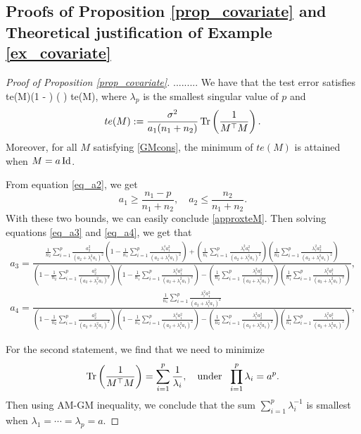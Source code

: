 \subsection{Proofs of Proposition \ref{prop_covariate} and Theoretical justification of Example \ref{ex_covariate}}\label{app_covariate}

\begin{proof}[Proof of Proposition \ref{prop_covariate}]

......... We have that the test error satisfies
\be\label{approxteM}  te(M)\left(1 -   \right)  \le  {}\tr\left( \right) \le te(M),\ee
where $\lambda_p$ is the smallest singular value of $p$ and
$$te(M):= \frac{\sigma^2}{a_1(n_1+n_2)}\operatorname{Tr}\left( \frac{1}{M^\top M}\right) .$$
Moreover, for all $M$ satisfying \eqref{GMcons}, the minimum of $te(M)$ is attained when $M= a\operatorname{Id}$.


From equation \eqref{eq_a2}, we get
$$a_1\ge \frac{n_1-p}{n_1+n_2},\quad a_2\le \frac{n_2}{n_1+n_2}.$$
With these two bounds, we can easily conclude \eqref{approxteM}. Then solving equations \eqref{eq_a3} and \eqref{eq_a4}, we get that
\begin{align*}
a_3= \frac{ \frac{1}{n_2}\sum_{i=1}^p \frac{a_2^2 }{ (  a_2 + \lambda_i^2a_1)^2  }\left(1 - \frac{1}{n_1} \sum_{i=1}^p \frac{\lambda_i^4 a_1^2  }{  (a_2 + \lambda_i^2a_1)^2  }\right) +\left( \frac{1}{n_1}\sum_{i=1}^p \frac{\lambda_i^2 a_1^2}{  (a_2 + \lambda_i^2a_1)^2  }\right) \left(\frac{1}{n_2}\sum_{i=1}^p \frac{  \lambda_i^2 a_2^2 }{ (  a_2 + \lambda_i^2a_1)^2  }\right) } {\left(1- \frac1{n_2}\sum_{i=1}^p \frac{a_2^2}{ (a_2 + \lambda_i^2a_1)^2  }\right) \left(1 - \frac{1}{n_1} \sum_{i=1}^p \frac{\lambda_i^4 a_1^2  }{  (a_2 + \lambda_i^2a_1)^2  }\right) - \left(\frac{1}{n_2}\sum_{i=1}^p \frac{  \lambda_i^2 a_2^2 }{ (  a_2 + \lambda_i^2a_1)^2  }\right) \left(\frac{1}{n_1}\sum_{i=1}^p \frac{\lambda_i^2 a_1^2 }{  (a_2 + \lambda_i^2a_1)^2  }\right)} ,
\end{align*}
\begin{align*}
a_4= \frac{\frac{1}{n_1}\sum_{i=1}^p \frac{\lambda_i^2 a_1^2}{  (a_2 + \lambda_i^2a_1)^2  }}{\left(1- \frac1{n_2}\sum_{i=1}^p \frac{a_2^2}{ (a_2 + \lambda_i^2a_1)^2  }\right) \left(1 - \frac{1}{n_1} \sum_{i=1}^p \frac{\lambda_i^4 a_1^2  }{  (a_2 + \lambda_i^2a_1)^2  }\right) - \left(\frac{1}{n_2}\sum_{i=1}^p \frac{  \lambda_i^2 a_2^2 }{ (  a_2 + \lambda_i^2a_1)^2  }\right) \left(\frac{1}{n_1}\sum_{i=1}^p \frac{\lambda_i^2 a_1^2 }{  (a_2 + \lambda_i^2a_1)^2  }\right)} ,
\end{align*}

For the second statement, we find that we need to minimize
$$\tr\left( \frac{1}{M^\top M}\right) = \sum_{i=1}^p\frac{1}{\lambda_i},\quad \text{under}\ \ \prod_{i=1}^p\lambda_i=a^p.$$
Then using AM-GM inequality, we conclude that the sum $\sum_{i=1}^p\lambda_i^{-1}$ is smallest when $\lambda_1=\cdots=\lambda_p = a$.
\end{proof}

